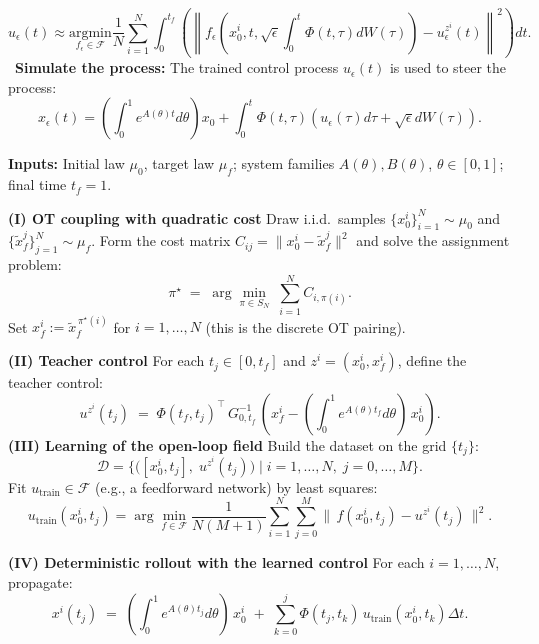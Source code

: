 \documentclass[12pt]{amsart}
\renewcommand{\(}{\left (}
\renewcommand{\)}{\right )}
\numberwithin{equation}{section}
\begin{document}
\begin{algorithm}[H]
\begin{algorithmic}[1]
\begin{equation*}%
u_{\epsilon}(t)\approx\underset{f_{\epsilon}\in \mathcal{F}}{\mathrm{argmin}}\frac{1}{N}\sum^N_{i=1}\int_0^{t_f}\left(\left\|f_{\epsilon}\left(x^i_0,t,\sqrt{\epsilon}\int_{0}^{t}\Phi(t,\tau) d W(\tau)\right)-u_{\epsilon}^{z^i}(t)\right\|^2\right)dt.
\end{equation*}
\Statex \textbullet~\textbf{Simulate the process:}
\State \hspace{\algorithmicindent} The trained control process $u_{\epsilon}(t)$ is used to steer the process:
\[
x_{\epsilon}(t)=\left(\int_0^1e^{A(\theta)t}d\theta\right) x_0+\int_0^t \Phi(t,\tau)(u_{\epsilon}(\tau)d\tau +\sqrt{\epsilon} dW(\tau)).
\]
\end{algorithmic}
\end{algorithm}


\begin{algorithm}[H]
\caption{Flow Matching for Deterministic Averaged Systems (OT Coupling)}
\label{alg:flow_matching_deterministic_ot_coupling}
\begin{algorithmic}[1]
\Statex \textbf{Inputs:} Initial law $\mu_0$, target law $\mu_f$; system families $A(\theta),B(\theta)$, $\theta\in[0,1]$; final time $t_f=1$.


\Statex\textbf{(I) OT coupling with quadratic cost}
\State Draw i.i.d.\ samples $\{x_0^i\}_{i=1}^N\sim\mu_0$ and $\{\tilde x_f^j\}_{j=1}^N\sim\mu_f$.
\State Form the cost matrix $C_{ij}=\|x_0^i-\tilde x_f^j\|^2$ and solve the assignment problem:
\[
\pi^\star \;=\;\arg\min_{\pi\in S_N}\;\sum_{i=1}^N C_{i,\pi(i)}.
\]
\State Set $x_f^i:=\tilde x_f^{\,\pi^\star(i)}$ for $i=1,\dots,N$ (this is the discrete OT pairing).

\Statex\textbf{(II) Teacher control}
\State For each $t_j\in[0,t_f]$ and $z^i=(x_0^i,x_f^i)$, define the teacher control:
\[
u^{z^i}(t_j)\;=\;\Phi(t_f,t_j)^{\!\top}\,G_{0,t_f}^{-1}\,(x_f^i - \left(\int_0^1e^{A(\theta)t_f}d\theta\right)\,x_0^i).
\]
\Statex\textbf{(III) Learning of the open-loop field}
\State Build the dataset on the grid $\{t_j\}$:
\[
\mathcal{D}
=\big\{\big([x_0^i,t_j],\;u^{z^i}(t_j)\big)\;\big|\; i=1,\dots,N,\;j=0,\dots,M\big\}.
\]
\State Fit $u_{\mathrm{train}}\in\mathcal{F}$ (e.g., a feedforward network) by least squares:
\[
u_{\mathrm{train}}(x_0^i,t_j)=\arg\min_{f\in\mathcal{F}} \frac{1}{N(M{+}1)}
\sum_{i=1}^N\sum_{j=0}^{M}\big\|\,f(x_0^i,t_j)-u^{z^i}(t_j)\,\big\|^2.
\]

\Statex\textbf{(IV) Deterministic rollout with the learned control}
\State For each $i= 1,\dots, N$, propagate:
\[
x^i(t_j)\;=\;\left(\int_0^1e^{A(\theta)t_j}d\theta\right)\,x_0^i
\;+\;\sum_{k=0}^{j}\Phi(t_j,t_k)\,u_{\mathrm{train}}(x_0^i,t_k)\Delta t.
\]
\end{algorithmic}
\end{algorithm}
\end{document}
